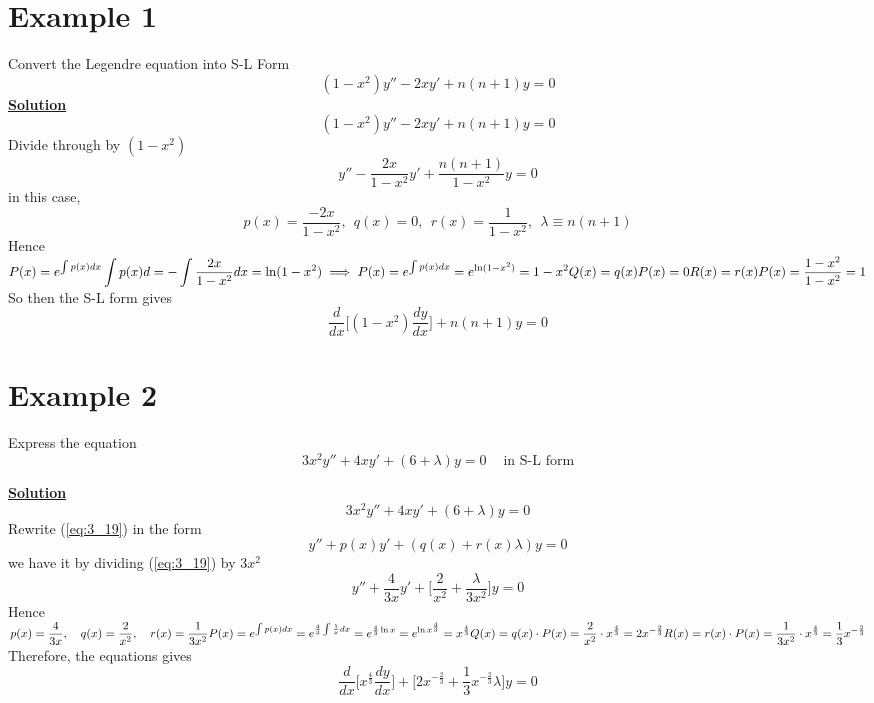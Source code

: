 \documentclass[12pt]{report}
\newcommand{\ubt}[1]{\textbf{\underline{#1}}}
\newcommand{\sps}{\\[0.2cm]}
\newcommand{\spn}[1]{\\[#1cm]}
\newcommand{\refn}[1]{(\ref{#1})}
\newcommand{\refx}[1]{\refn{eq:#1}}
\newcommand{\NI}{\noindent}
\newcommand{\dsp}{\displaystyle}
\newcommand{\sprime}{'}
\newcommand{\dprime}{''}
\begin{document}
	\section*{Example 1}
	Convert the Legendre equation into S-L Form
	\begin{equation*}
		(1-x^2)y\dprime - 2xy\sprime + n(n+1)y = 0
	\end{equation*}
	\ubt{Solution}\sps
	\begin{equation}
		(1-x^2)y\dprime - 2xy\sprime + n(n+1)y = 0 \label{eq:3_17}
	\end{equation}
	Divide through by $(1-x^2)$
	\begin{equation}
		y\dprime - \frac{2x}{1-x^2}y\sprime + \frac{n(n+1)}{1-x^2}y = 0 \label{eq:3_18}
	\end{equation}
	in this case,
	\begin{equation*}
		p(x) = \frac{-2x}{1-x^2}, ~~ q(x) = 0, ~~ r(x) = \frac{1}{1-x^2}, ~~ \lambda \equiv n(n+1)
	\end{equation*}
	Hence 
	$\dsp 
		P(x) = e^{\int p(x)dx}\sps
		\int p(x)d = - \int \frac{2x}{1-x^2}dx = \ln(1-x^2)\sps
		\implies P(x) = e^{\int p(x)dx} = e^{\ln(1-x^2)} = 1-x^2\sps
		Q(x) = q(x)P(x) = 0\sps
		R(x) = r(x)P(x) = \frac{1-x^2}{1-x^2} = 1\sps				
	$
	So then the S-L form gives
	\begin{equation*}
		\frac{d}{dx}\Big[(1-x^2)\frac{dy}{dx}\Big] + n(n+1)y = 0 
	\end{equation*}
	
	
	\section*{Example 2}
	Express the equation
	\begin{equation*}
		3x^2y\dprime + 4xy\sprime + (6+\lambda)y = 0 ~~~~\text{ in S-L form}
	\end{equation*}
	
	\NI\ubt{Solution}
	\begin{equation}
		3x^2y\dprime + 4xy\sprime + (6+\lambda)y = 0  \label{eq:3_19}
	\end{equation}
	Rewrite \refx{3_19} in the form
	\begin{equation*}
		y\dprime + p(x)y\sprime + (q(x) + r(x)\lambda)y = 0
	\end{equation*}
	we have it by dividing \refx{3_19} by $3x^2$
	\begin{equation*}
		y\dprime + \frac{4}{3x}y\sprime + \Big[\frac{2}{x^2} + \frac{\lambda}{3x^2}\Big]y = 0
	\end{equation*}
	Hence\sps
	$\dsp 
		p(x) = \frac{4}{3x}, ~~~ q(x) = \frac{2}{x^2}, ~~~ r(x) = \frac{1}{3x^2}\spn{0.5}
		\dsp P(x) = e^{\int p(x)dx} = e^{\frac{4}{3}\int\frac{1}{x}dx} = e^{\frac{4}{3}\ln x} = e^{\ln x^{\frac{4}{3}}} = x^{\frac{4}{3}}\sps
		\dsp Q(x) = q(x) \cdot P(x) = \frac{2}{x^2} \cdot x^{\frac{4}{3}} = 2x^{-\frac{2}{3}}\sps 
		R(x) = r(x) \cdot P(x) = \frac{1}{3x^2} \cdot x^{\frac{4}{3}} = \frac{1}{3}x^{-\frac{2}{3}}\sps
	$
	Therefore, the equations gives
	\begin{equation*}
		\frac{d}{dx}\Big[x^{\frac{4}{3}}\frac{dy}{dx}\Big] + \Big[2x^{-\frac{2}{3}} + \frac{1}{3}x^{-\frac{2}{3}}\lambda\Big]y = 0
	\end{equation*}
\end{document}

